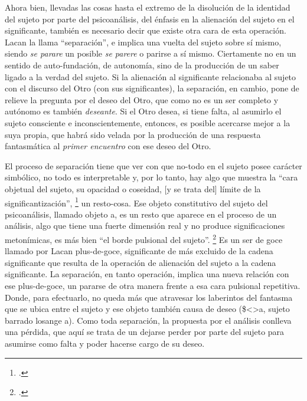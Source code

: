Ahora bien, llevadas las cosas hasta el extremo de la disolución de la identidad del sujeto por parte del psicoanálisis, del énfasis en la alienación del sujeto en el significante, también es necesario decir que existe otra cara de esta operación. Lacan la llama \enquote{separación}, e implica una vuelta del sujeto sobre sí mismo, siendo \emph{se parare} un posible \emph{se parere} o parirse a sí mismo. Ciertamente no en un sentido de auto-fundación, de autonomía, sino de la producción de un saber ligado a la verdad del sujeto. Si la alienación al significante relacionaba al sujeto con el discurso del Otro (con sus significantes), la separación, en cambio, pone de relieve la pregunta por el deseo del Otro, que como no es un ser completo y autónomo es también \emph{deseante}. Si el Otro desea, si tiene falta, al asumirlo el sujeto consciente e inconscientemente, entonces, es posible acercarse mejor a la suya propia, que habrá sido velada por la producción de una respuesta fantasmática al \emph{primer encuentro} con ese deseo del Otro.

El proceso de separación tiene que ver con que no-todo en el sujeto posee carácter simbólico, no todo es interpretable y, por lo tanto, hay algo que muestra la \enquote{cara objetual del sujeto, su opacidad o coseidad, {[}y se trata del{]} límite de la significantización}, \footcite[][120]{@7016-MARQUESRODILLA2001} un resto-cosa. Ese objeto constitutivo del sujeto del psicoanálisis, llamado objeto a, es un resto que aparece en el proceso de un análisis, algo que tiene una fuerte dimensión real y no produce significaciones metonímicas, es más bien \enquote{el borde pulsional del sujeto}. \footcite[][118]{@7016-MARQUESRODILLA2001} Es un ser de goce llamado por Lacan plus-de-goce, significante de más excluido de la cadena significante que resulta de la operación de alienación del sujeto a la cadena significante. La separación, en tanto operación, implica una nueva relación con ese plus-de-goce, un pararse de otra manera frente a esa cara pulsional repetitiva. Donde, para efectuarlo, no queda más que atravesar los laberintos del fantasma que se ubica entre el sujeto y ese objeto también causa de deseo (\$\textless\textgreater a, sujeto barrado losange a). Como toda separación, la propuesta por el análisis conlleva una pérdida, que aquí se trata de un dejarse perder por parte del sujeto para asumirse como falta y poder hacerse cargo de su deseo.

